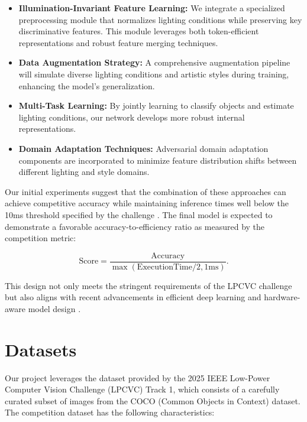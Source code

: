 \documentclass[11pt, oneside]{article}   	%
\begin{document}
\begin{itemize}
	\item \textbf{Illumination-Invariant Feature Learning:} We integrate a specialized preprocessing module that normalizes lighting conditions while preserving key discriminative features. This module leverages both token-efficient representations and robust feature merging techniques.

	\item \textbf{Data Augmentation Strategy:} A comprehensive augmentation pipeline will simulate diverse lighting conditions and artistic styles during training, enhancing the model’s generalization.

	\item \textbf{Multi-Task Learning:} By jointly learning to classify objects and estimate lighting conditions, our network develops more robust internal representations.

	\item \textbf{Domain Adaptation Techniques:} Adversarial domain adaptation components are incorporated to minimize feature distribution shifts between different lighting and style domains.
\end{itemize}

Our initial experiments suggest that the combination of these approaches can achieve competitive accuracy while maintaining inference times well below the 10ms threshold specified by the challenge \cite{chen20242023lowpowercomputervision}. The final model is expected to demonstrate a favorable accuracy-to-efficiency ratio as measured by the competition metric:

\begin{equation}
	\label{eq:finalScore}
	\text{Score} = \frac{\text{Accuracy}}{\max(\text{ExecutionTime}/2, 1\text{ms})}.
\end{equation}


This design not only meets the stringent requirements of the LPCVC challenge but also aligns with recent advancements in efficient deep learning and hardware-aware model design \cite{deepseekai2025deepseekv3technicalreport}.




\section*{Datasets}

Our project leverages the dataset provided by the 2025 IEEE Low-Power Computer Vision Challenge (LPCVC) Track 1, which consists of a carefully curated subset of images from the COCO (Common Objects in Context) dataset. The competition dataset has the following characteristics:
\end{document}
